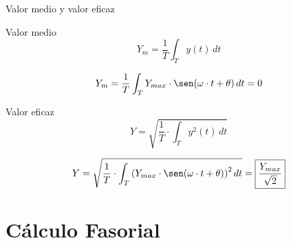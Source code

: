 \documentclass[aspectratio=169, usenames,svgnames,dvipsnames]{beamer}
\begin{document}
\begin{frame}[label={sec:org7e47123}]{Valor medio y valor eficaz}
\begin{block}{Valor medio}
\[
Y_m=\frac{1}{T}\int_{T} y(t)\, dt
\]

\[
Y_m=\frac{1}{T}\int_T Y_{max}\cdot\sen(\omega \cdot t+\theta)\, dt=0
\]
\end{block}
\begin{block}{Valor eficaz}
\[
Y = \sqrt{\frac{1}{T}\cdot\int_T y^{2}(t)\, dt}
\]

\[
Y=\sqrt{\frac{1}{T}\cdot\int_T \left(Y_{max}\cdot\sen(\omega\cdot t+\theta)\right)^{2}dt}=\boxed{\frac{Y_{max}}{\sqrt{2}}}
\]
\end{block}
\end{frame}

\section{Cálculo Fasorial}
\label{sec:orgc6dfde5}
\end{document}
